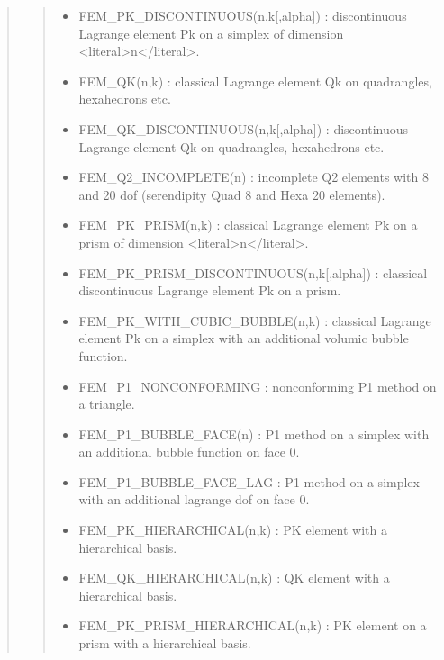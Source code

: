 \documentclass[a4paper,11pt,english]{sphinxmanual}
\begin{document}
\begin{quote}
\begin{quote}
\begin{itemize}
\item {} 
\sphinxAtStartPar
FEM\_PK\_DISCONTINUOUS(n,k{[},alpha{]}) :
discontinuous Lagrange element Pk on a simplex of dimension \textless{}literal\textgreater{}n\textless{}/literal\textgreater{}.

\item {} 
\sphinxAtStartPar
FEM\_QK(n,k) :
classical Lagrange element Qk on quadrangles, hexahedrons etc.

\item {} 
\sphinxAtStartPar
FEM\_QK\_DISCONTINUOUS(n,k{[},alpha{]}) :
discontinuous Lagrange element Qk on quadrangles, hexahedrons etc.

\item {} 
\sphinxAtStartPar
FEM\_Q2\_INCOMPLETE(n) :
incomplete Q2 elements with 8 and 20 dof (serendipity Quad 8 and
Hexa 20 elements).

\item {} 
\sphinxAtStartPar
FEM\_PK\_PRISM(n,k) :
classical Lagrange element Pk on a prism of dimension \textless{}literal\textgreater{}n\textless{}/literal\textgreater{}.

\item {} 
\sphinxAtStartPar
FEM\_PK\_PRISM\_DISCONTINUOUS(n,k{[},alpha{]}) :
classical discontinuous Lagrange element Pk on a prism.

\item {} 
\sphinxAtStartPar
FEM\_PK\_WITH\_CUBIC\_BUBBLE(n,k) :
classical Lagrange element Pk on a simplex with an additional
volumic bubble function.

\item {} 
\sphinxAtStartPar
FEM\_P1\_NONCONFORMING :
non\sphinxhyphen{}conforming P1 method on a triangle.

\item {} 
\sphinxAtStartPar
FEM\_P1\_BUBBLE\_FACE(n) :
P1 method on a simplex with an additional bubble function on face 0.

\item {} 
\sphinxAtStartPar
FEM\_P1\_BUBBLE\_FACE\_LAG :
P1 method on a simplex with an additional lagrange dof on face 0.

\item {} 
\sphinxAtStartPar
FEM\_PK\_HIERARCHICAL(n,k) :
PK element with a hierarchical basis.

\item {} 
\sphinxAtStartPar
FEM\_QK\_HIERARCHICAL(n,k) :
QK element with a hierarchical basis.

\item {} 
\sphinxAtStartPar
FEM\_PK\_PRISM\_HIERARCHICAL(n,k) :
PK element on a prism with a hierarchical basis.


\end{itemize}
\end{quote}
\end{quote}
\end{document}
